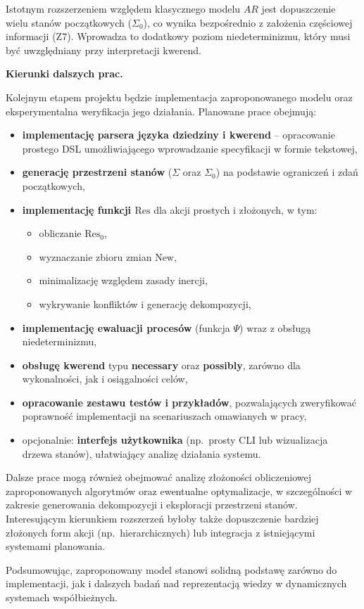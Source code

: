 \documentclass[11pt,a4paper]{article}
\newif\ifshowbib
\theoremstyle{definition}
\begin{document}
Istotnym rozszerzeniem względem klasycznego modelu $AR$ jest dopuszczenie wielu stanów początkowych ($\Sigma_0$), co wynika bezpośrednio z założenia częściowej informacji (Z7). Wprowadza to dodatkowy poziom niedeterminizmu, który musi być uwzględniany przy interpretacji kwerend.

\medskip

\textbf{Kierunki dalszych prac.}

Kolejnym etapem projektu będzie implementacja zaproponowanego modelu oraz eksperymentalna weryfikacja jego działania. Planowane prace obejmują:

\begin{itemize}
    \item \textbf{implementację parsera języka dziedziny i kwerend} -- opracowanie prostego DSL umożliwiającego wprowadzanie specyfikacji w formie tekstowej,
    \item \textbf{generację przestrzeni stanów} ($\Sigma$ oraz $\Sigma_0$) na podstawie ograniczeń i zdań początkowych,
    \item \textbf{implementację funkcji $\mathrm{Res}$} dla akcji prostych i złożonych, w tym:
    \begin{itemize}
        \item obliczanie $\mathrm{Res}_0$,
        \item wyznaczanie zbioru zmian $\mathrm{New}$,
        \item minimalizację względem zasady inercji,
        \item wykrywanie konfliktów i generację dekompozycji,
    \end{itemize}
    \item \textbf{implementację ewaluacji procesów} (funkcja $\Psi$) wraz z obsługą niedeterminizmu,
    \item \textbf{obsługę kwerend} typu \textbf{necessary} oraz \textbf{possibly}, zarówno dla wykonalności, jak i osiągalności celów,
    \item \textbf{opracowanie zestawu testów i przykładów}, pozwalających zweryfikować poprawność implementacji na scenariuszach omawianych w pracy,
    \item opcjonalnie: \textbf{interfejs użytkownika} (np.\ prosty CLI lub wizualizacja drzewa stanów), ułatwiający analizę działania systemu.
\end{itemize}

Dalsze prace mogą również obejmować analizę złożoności obliczeniowej zaproponowanych algorytmów oraz ewentualne optymalizacje, w szczególności w zakresie generowania dekompozycji i eksploracji przestrzeni stanów. Interesującym kierunkiem rozszerzeń byłoby także dopuszczenie bardziej złożonych form akcji (np.\ hierarchicznych) lub integracja z istniejącymi systemami planowania.

Podsumowując, zaproponowany model stanowi solidną podstawę zarówno do implementacji, jak i dalszych badań nad reprezentacją wiedzy w dynamicznych systemach współbieżnych.

\ifshowbib
\section{Literatura}

\fi
\end{document}
